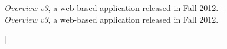 \begin{figure}
	\centering
	\caption
	[
	    \textsl{Overview v3}, a web-based application released in Fall 2012.
	]
	{
    	\textsl{Overview v3}, a web-based application released in Fall 2012.
	}
	\centering
	\label{app:overview:fig:overview-v3}
\end{figure}


